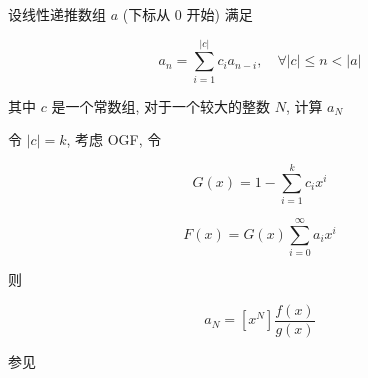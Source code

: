 设线性递推数组 \(a\) (下标从 \(0\) 开始) 满足

\[
    a_n=\sum_{i=1}^{|c|} c_i a_{n-i},\quad \forall |c|\leq n < |a|
\]

其中 \(c\) 是一个常数组, 对于一个较大的整数 \(N\), 计算 \(a_N\)

令 \(|c|=k\), 考虑 OGF, 令

\[
    G(x)=1-\sum_{i=1}^k c_ix^i
\]

\[
    F(x)=G(x)\sum_{i=0}^{\infty} a_ix^i
\]

则

\[
    a_N=\left[x^N\right]\frac{f(x)}{g(x)}
\]

参见 
